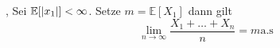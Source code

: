 \sep
\Theo[6.1] \newline
Sei \( \mathbb{E}[\left\lvert x_1 \right\rvert] < \infty \). Setze \(m = \mathbb{E}[X_1]\) dann gilt \[ \lim_{n \rightarrow \infty} \frac{X_1 + \dots + X_n}{n} = m \text{a.s}\]
